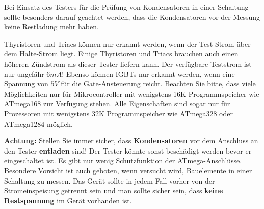  Bei Einsatz des Testers für die Prüfung von Kondensatoren in einer Schaltung sollte besonders darauf geachtet werden,
 dass die Kondensatoren vor der Messung keine Restladung mehr haben.


Thyristoren und Triacs können nur erkannt werden, wenn der Test-Strom über dem Halte-Strom liegt.
Einige Thyristoren und Triacs brauchen auch einen höheren Zündstrom als dieser Tester liefern kann.
Der verfügbare Teststrom ist nur ungefähr \(6mA\)!
Ebenso können IGBTs nur erkannt werden, wenn eine Spannung von \(5V\) für die Gate-Ansteuerung reicht.
Beachten Sie bitte, dass viele Möglichkeiten nur für Mikrocontroller mit wenigstens 16K Programmspeicher wie ATmega168 zur Verfügung stehen. 
Alle Eigenschaften sind sogar nur für Prozessoren mit wenigstens 32K Programmspeicher wie ATmega328 oder ATmega1284 möglich.

\vspace{1cm}
\textbf{{\Large Achtung:}} Stellen Sie immer sicher, dass {\bf Kondensatoren} vor dem Anschluss an den Tester {\bf entladen} sind!
Der Tester könnte sonst beschädigt werden bevor er eingeschaltet ist.
Es gibt nur wenig Schutzfunktion der ATmega-Anschlüsse.
Besondere Vorsicht ist auch geboten, wenn versucht wird, Bauelemente in einer Schaltung zu messen.
Das Gerät sollte in jedem Fall vorher von der Strom\-ein\-spei\-sung getrennt sein und man sollte sicher sein,
dass {\bf keine Restspannung} im Gerät vorhanden ist.


